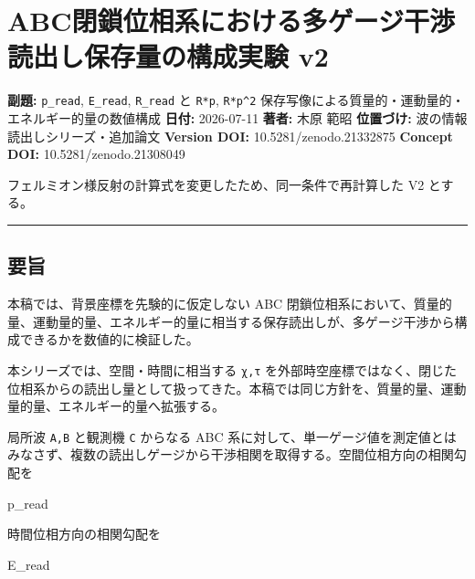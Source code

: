 \documentclass[
  a4paper,
]{article}
\author{}
\date{}
\newenvironment{Shaded}{}{}
\newcommand{\NormalTok}[1]{#1}
\begin{document}
\section{ABC閉鎖位相系における多ゲージ干渉読出し保存量の構成実験
v2}\label{abcux9589ux9396ux4f4dux76f8ux7cfbux306bux304aux3051ux308bux591aux30b2ux30fcux30b8ux5e72ux6e09ux8aadux51faux3057ux4fddux5b58ux91cfux306eux69cbux6210ux5b9fux9a13-v2}

\textbf{副題:} \texttt{p\_read}, \texttt{E\_read}, \texttt{R\_read} と
\texttt{R*p}, \texttt{R*p\^{}2}
保存写像による質量的・運動量的・エネルギー的量の数値構成 \textbf{日付:}
2026-07-11 \textbf{著者:} 木原 範昭 \textbf{位置づけ:}
波の情報読出しシリーズ・追加論文 \textbf{Version DOI:}
10.5281/zenodo.21332875 \textbf{Concept DOI:} 10.5281/zenodo.21308049

フェルミオン様反射の計算式を変更したため、同一条件で再計算した V2
とする。

\begin{center}\rule{0.5\linewidth}{0.5pt}\end{center}

\subsection{要旨}\label{ux8981ux65e8}

本稿では、背景座標を先験的に仮定しない ABC
閉鎖位相系において、質量的量、運動量的量、エネルギー的量に相当する保存読出しが、多ゲージ干渉から構成できるかを数値的に検証した。

本シリーズでは、空間・時間に相当する \texttt{χ,τ}
を外部時空座標ではなく、閉じた位相系からの読出し量として扱ってきた。本稿では同じ方針を、質量的量、運動量的量、エネルギー的量へ拡張する。

局所波 \texttt{A,B} と観測機 \texttt{C} からなる ABC
系に対して、単一ゲージ値を測定値とはみなさず、複数の読出しゲージから干渉相関を取得する。空間位相方向の相関勾配を

\begin{Shaded}
\begin{Highlighting}[]
\NormalTok{p\_read}
\end{Highlighting}
\end{Shaded}

時間位相方向の相関勾配を

\begin{Shaded}
\begin{Highlighting}[]
\NormalTok{E\_read}
\end{Highlighting}
\end{Shaded}
\end{document}
